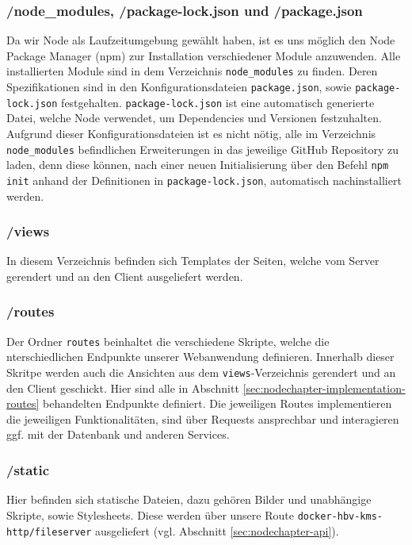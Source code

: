 \subsubsection*{/node\_modules, /package-lock.json und /package.json}
Da wir Node als Laufzeitumgebung gewählt haben, ist es uns möglich den Node Package Manager (npm) zur Installation verschiedener Module anzuwenden. Alle installierten Module sind in dem Verzeichnis \verb|node_modules| zu finden. Deren Spezifikationen sind in den Konfigurationsdateien \verb|package.json|, sowie \verb|package-lock.json| festgehalten. \verb|package-lock.json| ist eine automatisch generierte Datei, welche Node verwendet, um Dependencies und Versionen festzuhalten. Aufgrund dieser Konfigurationsdateien ist es nicht nötig, alle im Verzeichnis \verb|node_modules| befindlichen Erweiterungen in das jeweilige GitHub Repository zu laden, denn diese können, nach einer neuen Initialisierung über den Befehl \verb|npm init| anhand der Definitionen in \verb|package-lock.json|, automatisch nachinstalliert werden.

\subsubsection*{/views}
In diesem Verzeichnis befinden sich Templates der Seiten, welche vom Server gerendert und an den Client ausgeliefert werden.

\subsubsection*{/routes}
Der Ordner \verb|routes| beinhaltet die verschiedene Skripte, welche die  nterschiedlichen Endpunkte unserer Webanwendung definieren. Innerhalb dieser Skritpe werden auch die Ansichten aus dem \verb|views|-Verzeichnis gerendert und an den Client geschickt. Hier sind alle in Abschnitt \ref{sec:nodechapter-implementation-routes} behandelten Endpunkte definiert. Die jeweiligen Routes implementieren die jeweiligen Funktionalitäten, sind über Requests ansprechbar und interagieren ggf. mit der Datenbank und anderen Services.

\subsubsection*{/static}
Hier befinden sich statische Dateien, dazu gehören Bilder und unabhängige Skripte, sowie Stylesheets. Diese werden über unsere Route \verb|docker-hbv-kms-http/fileserver| ausgeliefert (vgl. Abschnitt \ref{sec:nodechapter-api}).

